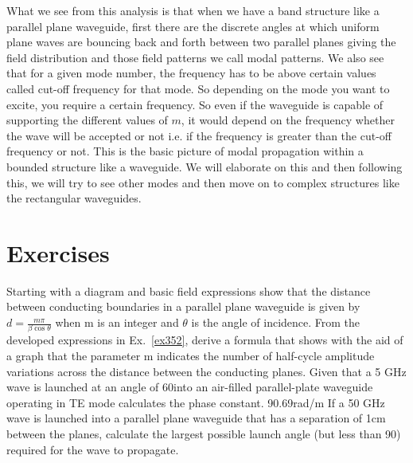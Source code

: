 What we see from this analysis is that when we have a band structure like a parallel plane waveguide, first there are the discrete angles at which uniform plane waves are bouncing back and forth between two parallel planes giving the field distribution and those field patterns we call modal patterns. We also see that for a given mode number, the frequency has to be above certain values called cut-off frequency for that mode. So depending on the mode you want to excite, you require a certain frequency. So even if the waveguide is capable of supporting the different values of $m$, it would depend on the frequency whether the wave will be accepted or not i.e. if the frequency is greater than the cut-off frequency or not. This is the basic picture of modal propagation within a bounded structure like a waveguide. We will elaborate on this and then following this, we will try to see other modes and then move on to complex structures like the rectangular waveguides.

\section*{Exercises}
\begin{ExerciseList}
\Exercise[label={ex351}]
Starting with a diagram and basic field expressions show that the distance between conducting boundaries in a parallel plane waveguide is given by $d = \frac{m\pi}{\beta\cos\theta}$ when m is an integer and $\theta$ is the angle of incidence.
\Exercise[label={ex352}]
From the developed expressions in Ex.~\ref{ex352}, derive a formula that shows with the aid of a graph that the parameter m indicates the number of half-cycle amplitude variations across the distance between the conducting planes.
\Exercise[label={ex353}]
Given that a  5 GHz wave is launched at an angle of 60\textdegree into an air-filled parallel-plate waveguide operating in TE mode calculates the phase constant.
\Answer[ref={ex353}]
90.69rad/m
\Exercise[label={ex354}]
If a 50 GHz wave is launched into a parallel plane waveguide that has a separation of 1cm between the planes, calculate the largest possible launch angle (but less than 90\textdegree) required for the wave to propagate.
\textdegree

\end{ExerciseList}
